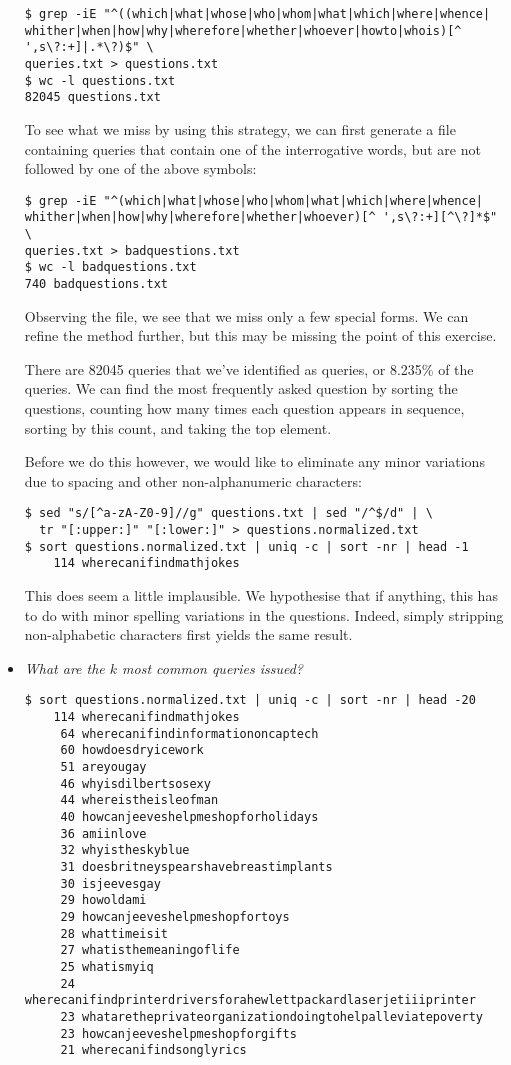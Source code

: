 \begin{itemize}
\begin{lstlisting}
$ grep -iE "^((which|what|whose|who|whom|what|which|where|whence|
whither|when|how|why|wherefore|whether|whoever|howto|whois)[^ ',s\?:+]|.*\?)$" \
queries.txt > questions.txt
$ wc -l questions.txt 
82045 questions.txt
\end{lstlisting}

To see what we miss by using this strategy, we can first generate a file
containing queries that contain one of the interrogative words, but are not
followed by one of the above symbols:

\begin{lstlisting}
$ grep -iE "^(which|what|whose|who|whom|what|which|where|whence|
whither|when|how|why|wherefore|whether|whoever)[^ ',s\?:+][^\?]*$" \
queries.txt > badquestions.txt
$ wc -l badquestions.txt 
740 badquestions.txt
\end{lstlisting}

Observing the file, we see that we miss only a few special forms. We can refine
the method further, but this may be missing the point of this exercise.

There are 82045 queries that we've identified as queries, or 8.235\% of the
queries. We can find the most frequently asked question by sorting the
questions, counting how many times each question appears in sequence, sorting
by this count, and taking the top element.

Before we do this however, we would like to eliminate any minor variations due
to spacing and other non-alphanumeric characters:

\begin{lstlisting}
$ sed "s/[^a-zA-Z0-9]//g" questions.txt | sed "/^$/d" | \
  tr "[:upper:]" "[:lower:]" > questions.normalized.txt
$ sort questions.normalized.txt | uniq -c | sort -nr | head -1
    114 wherecanifindmathjokes
\end{lstlisting}

This does seem a little implausible. We hypothesise that if anything, this has
to do with minor spelling variations in the questions. Indeed, simply stripping
non-alphabetic characters first yields the same result.

\item \emph{What are the $k$ most common queries issued?}

\begin{lstlisting}
$ sort questions.normalized.txt | uniq -c | sort -nr | head -20
    114 wherecanifindmathjokes
     64 wherecanifindinformationoncaptech
     60 howdoesdryicework
     51 areyougay
     46 whyisdilbertsosexy
     44 whereistheisleofman
     40 howcanjeeveshelpmeshopforholidays
     36 amiinlove
     32 whyistheskyblue
     31 doesbritneyspearshavebreastimplants
     30 isjeevesgay
     29 howoldami
     29 howcanjeeveshelpmeshopfortoys
     28 whattimeisit
     27 whatisthemeaningoflife
     25 whatismyiq
     24 wherecanifindprinterdriversforahewlettpackardlaserjetiiiprinter
     23 whataretheprivateorganizationdoingtohelpalleviatepoverty
     23 howcanjeeveshelpmeshopforgifts
     21 wherecanifindsonglyrics
\end{lstlisting}


\end{itemize}
